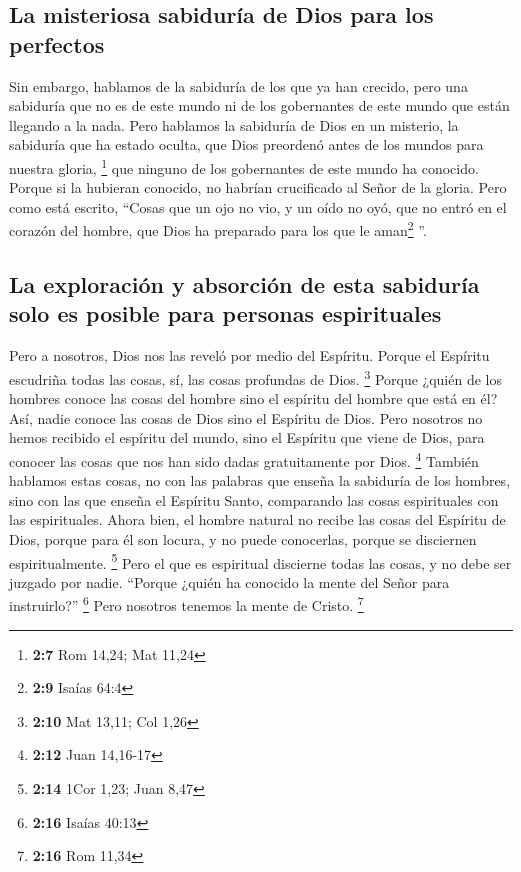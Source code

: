 \hypertarget{la-misteriosa-sabiduruxeda-de-dios-para-los-perfectos}{%
\subsection{La misteriosa sabiduría de Dios para los
perfectos}\label{la-misteriosa-sabiduruxeda-de-dios-para-los-perfectos}}

 Sin embargo, hablamos de la sabiduría de los que ya han
crecido, pero una sabiduría que no es de este mundo ni de los
gobernantes de este mundo que están llegando a la nada. 
Pero hablamos la sabiduría de Dios en un misterio, la sabiduría que ha
estado oculta, que Dios preordenó antes de los mundos para nuestra
gloria, \footnote{\textbf{2:7} Rom 14,24; Mat 11,24}  que
ninguno de los gobernantes de este mundo ha conocido. Porque si la
hubieran conocido, no habrían crucificado al Señor de la gloria.
 Pero como está escrito, ``Cosas que un ojo no vio, y un
oído no oyó, que no entró en el corazón del hombre, que Dios ha
preparado para los que le aman\footnote{\textbf{2:9} Isaías 64:4} ''.

\hypertarget{la-exploraciuxf3n-y-absorciuxf3n-de-esta-sabiduruxeda-solo-es-posible-para-personas-espirituales}{%
\subsection{La exploración y absorción de esta sabiduría solo es posible
para personas
espirituales}\label{la-exploraciuxf3n-y-absorciuxf3n-de-esta-sabiduruxeda-solo-es-posible-para-personas-espirituales}}

 Pero a nosotros, Dios nos las reveló por medio del
Espíritu. Porque el Espíritu escudriña todas las cosas, sí, las cosas
profundas de Dios. \footnote{\textbf{2:10} Mat 13,11; Col 1,26}
 Porque ¿quién de los hombres conoce las cosas del hombre
sino el espíritu del hombre que está en él? Así, nadie conoce las cosas
de Dios sino el Espíritu de Dios.  Pero nosotros no hemos
recibido el espíritu del mundo, sino el Espíritu que viene de Dios, para
conocer las cosas que nos han sido dadas gratuitamente por Dios.
\footnote{\textbf{2:12} Juan 14,16-17}  También hablamos
estas cosas, no con las palabras que enseña la sabiduría de los hombres,
sino con las que enseña el Espíritu Santo, comparando las cosas
espirituales con las espirituales.  Ahora bien, el hombre
natural no recibe las cosas del Espíritu de Dios, porque para él son
locura, y no puede conocerlas, porque se disciernen espiritualmente.
\footnote{\textbf{2:14} 1Cor 1,23; Juan 8,47}  Pero el
que es espiritual discierne todas las cosas, y no debe ser juzgado por
nadie.  ``Porque ¿quién ha conocido la mente del Señor
para instruirlo?'' \footnote{\textbf{2:16} Isaías 40:13} Pero nosotros
tenemos la mente de Cristo. \footnote{\textbf{2:16} Rom 11,34}

